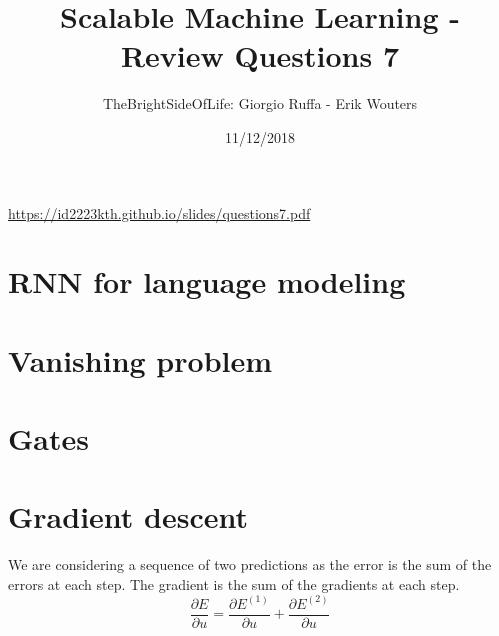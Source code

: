 \documentclass[a4paper]{article}
\title{Scalable Machine Learning - Review Questions 7}
\author{TheBrightSideOfLife: Giorgio Ruffa - Erik Wouters}
\date{11/12/2018}
\begin{document}
\maketitle

\url{https://id2223kth.github.io/slides/questions7.pdf}

\section{RNN for language modeling} %

\section{Vanishing problem} %

\section{Gates} %

\section{Gradient descent} %
We are considering a sequence of two predictions as the error is the sum of the errors at each step. The gradient is the sum of the gradients at each step.
\begin{equation}
    \frac{\partial E}{\partial u} = \frac{\partial E^{(1)}}{\partial u} + \frac{\partial E^{(2)}}{\partial u}
\end{equation}


% 
\end{document}
